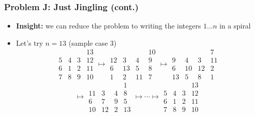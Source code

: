 \begin{frame}
  \frametitle{Problem J: Just Jingling (cont.)}

  \begin{itemize}
    \item \textbf{Insight:} we can reduce the problem to writing the integers $1\dots n$ in a spiral
    \item Let's try $n=13$ (sample case 3)
      \[
        \begin{array}{cccc}
            &    &   & 13\\
          5 & 4  & 3 & 12\\
          6 & 1 & 2 & 11\\
          7 & 8 & 9 & 10
        \end{array}
        \mapsto
        \begin{array}{cccc}
            &    &   & 10\\
          12 & 3  & 4 & 9\\
          6 & 13 & 5 & 8\\
          1 & 2 & 11 & 7
        \end{array}
        \mapsto
        \begin{array}{cccc}
            &    &   & 7\\
          9 & 4  & 3 & 11\\
          6 & 10 & 12 & 2\\
          13 & 5 & 8 & 1
        \end{array}
      \]
      \[
        \mapsto
        \begin{array}{cccc}
            &    &   & 1\\
          11 & 3  & 4 & 8\\
          6 & 7 & 9 & 5\\
          10 & 12 & 2 & 13
        \end{array}
        \mapsto \cdots \mapsto
        \begin{array}{cccc}
            &    &   & 13\\
          5 & 4  & 3 & 12\\
          6 & 1 & 2 & 11\\
          7 & 8 & 9 & 10
        \end{array}
      \]
  \end{itemize}
\end{frame}

